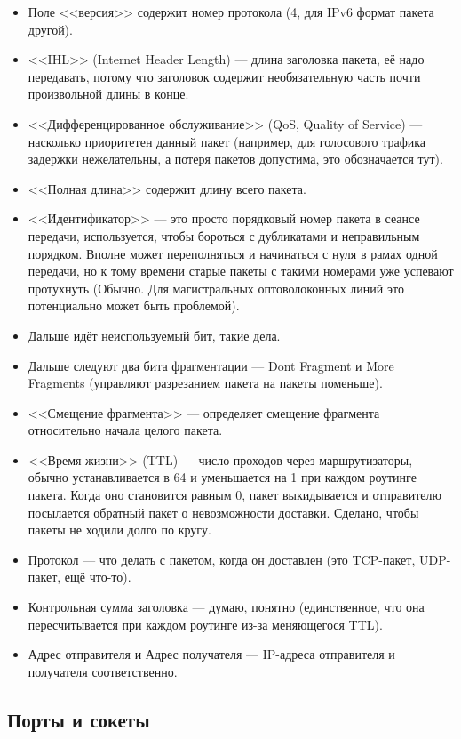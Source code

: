 \documentclass[a5paper]{article}
\begin{document}
\begin{itemize}
    \item Поле <<версия>> содержит номер протокола (4, для IPv6 формат пакета другой).
    \item <<IHL>> (Internet Header Length) --- длина заголовка пакета, её надо передавать, потому что заголовок содержит необязательную часть почти произвольной длины в конце.
    \item <<Дифференцированное обслуживание>> (QoS, Quality of Service) --- насколько приоритетен данный пакет (например, для голосового трафика задержки нежелательны, а потеря пакетов допустима, это обозначается тут).
    \item <<Полная длина>> содержит длину всего пакета.
    \item <<Идентификатор>> --- это просто порядковый номер пакета в сеансе передачи, используется, чтобы бороться с дубликатами и неправильным порядком. Вполне может переполняться и начинаться с нуля в рамах одной передачи, но к тому времени старые пакеты с такими номерами уже успевают протухнуть (Обычно. Для магистральных оптоволоконных линий это потенциально может быть проблемой).
    \item Дальше идёт неиспользуемый бит, такие дела.
    \item Дальше следуют два бита фрагментации --- Dont Fragment и More Fragments (управляют разрезанием пакета на пакеты поменьше).
    \item <<Смещение фрагмента>> --- определяет смещение фрагмента относительно начала целого пакета.
    \item <<Время жизни>> (TTL) --- число проходов через маршрутизаторы, обычно устанавливается в 64 и уменьшается на 1 при каждом роутинге пакета. Когда оно становится равным 0, пакет выкидывается и отправителю посылается обратный пакет о невозможности доставки. Сделано, чтобы пакеты не ходили долго по кругу.
    \item Протокол --- что делать с пакетом, когда он доставлен (это TCP-пакет, UDP-пакет, ещё что-то).
    \item Контрольная сумма заголовка --- думаю, понятно (единственное, что она пересчитывается при каждом роутинге из-за меняющегося TTL).
    \item Адрес отправителя и Адрес получателя --- IP-адреса отправителя и получателя соответственно.
\end{itemize}

\subsection{Порты и сокеты}
\end{document}
